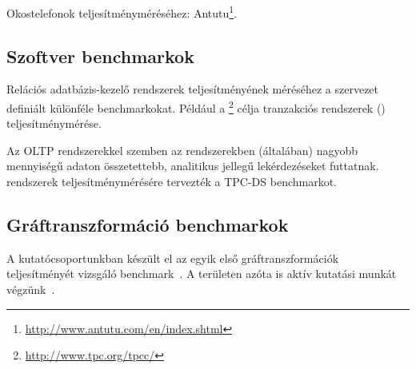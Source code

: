 Okostelefonok teljesítményméréséhez: Antutu\footnote{\url{http://www.antutu.com/en/index.shtml}}.

\subsection{Szoftver benchmarkok}

Relációs adatbázis-kezelő rendszerek teljesítményének méréséhez a  szervezet definiált különféle benchmarkokat. Például a \footnote{\url{http://www.tpc.org/tpcc/}} célja tranzakciós rendszerek () teljesítménymérése.

\begin{megjegyzes}
Az OLTP rendszerekkel szemben az  rendszerekben (általában) nagyobb mennyiségű adaton összetettebb, analitikus jellegű lekérdezéseket futtatnak.  rendszerek teljesítménymérésére tervezték a \mbox{TPC-DS} benchmarkot.
\end{megjegyzes}


\subsection{Gráftranszformáció benchmarkok}

A kutatócsoportunkban készült el az egyik első gráftranszformációk teljesítményét vizsgáló benchmark~\cite{vlhcc05_vsv}. A területen azóta is aktív kutatási munkát végzünk~\cite{DBLP:conf/staf/SzarnyasSRV15}.

